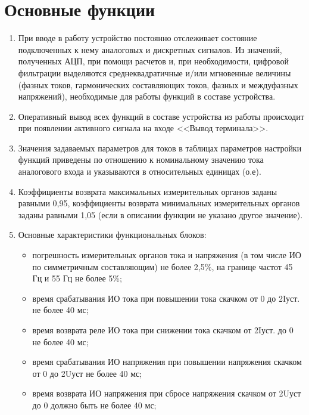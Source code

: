 \color{uniblue}\section[Основные функции]{Основные функции}\label{sec:funcs}
\color{black}

\color{black}

\begin{enumerate}
    
\item
При вводе в работу устройство постоянно отслеживает состояние подключенных к нему аналоговых и дискретных сигналов. Из значений, полученных АЦП, при помощи расчетов и, при необходимости, цифровой фильтрации выделяются среднеквадратичные и/или мгновенные величины (фазных токов, гармонических составляющих токов, фазных и междуфазных напряжений), необходимые для работы функций в составе устройства.
\item
Оперативный вывод всех функций в составе устройства из работы происходит при появлении активного сигнала на входе <<Вывод терминала>>. 
\item
Значения задаваемых параметров для токов в таблицах параметров настройки функций приведены по отношению к номинальному значению тока аналогового входа и указываются в относительных единицах (о.е).
\item
Коэффициенты возврата максимальных измерительных органов заданы равными 0,95, коэффициенты возврата минимальных измерительных органов заданы равными 1,05 (если в описании функции не указано другое значение).
\item
Основные характеристики функциональных блоков:
\begin{itemize}
    \item погрешность измерительных органов тока и напряжения (в том числе ИО по симметричным составляющим) не более 2,5\%, на границе частот 45 Гц и 55 Гц не более 5\%;
    \item время срабатывания ИО тока при повышении тока скачком от 0 до 2Iуст. не более 40 мс;
    \item время возврата реле ИО тока при снижении тока скачком от 2Iуст. до 0 не более 40 мс;
    \item время срабатывания ИО напряжения при повышении напряжения скачком от 0 до 2Uуст не более 40 мс;
    \item время возврата ИО напряжения при сбросе напряжения скачком от 2Uуст до 0 должно быть не более 40 мс; 

\end{itemize}
\end{enumerate}
